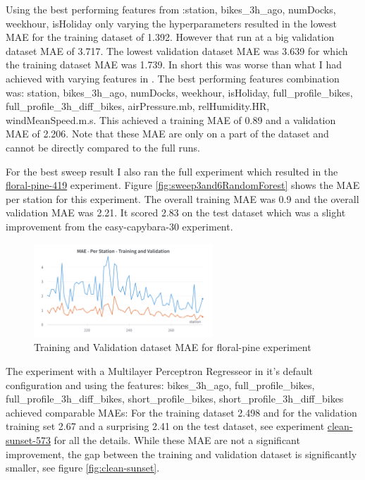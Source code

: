 \documentclass[a4paper]{article}
\begin{document}
    Using the best performing features from :station, bikes\_3h\_ago, numDocks, weekhour, isHoliday
    only varying the hyperparameters resulted in the lowest MAE for the training dataset of 1.392. However that run at
    a big validation dataset MAE of 3.717. The lowest validation dataset MAE was 3.639 for which the training dataset
    MAE was 1.739. In short this was worse than what I had achieved with varying features in .
    The best performing features combination was: station, bikes\_3h\_ago, numDocks, weekhour, isHoliday, full\_profile\_bikes,
    full\_profile\_3h\_diff\_bikes, airPressure.mb, relHumidity.HR, windMeanSpeed.m.s. This achieved a training MAE of 0.89
    and a validation MAE of 2.206. Note that these MAE are only on a part of the dataset and cannot be directly compared
    to the full runs.

    For the best sweep result I also ran the full experiment which resulted in the
    \href{https://wandb.ai/idegen/mlp-2021/runs/2kmp7odq?workspace=user-idegen}{floral-pine-419} experiment. Figure \ref{fig:sweep3and6RandomForest}
    shows the MAE per station for this experiment. The overall training MAE was 0.9 and the overall validation MAE was
    2.21. It scored 2.83 on the test dataset which was a slight improvement from the easy-capybara-30 experiment.

    \begin{figure}[h]
        \centering
        \includegraphics[width=0.6\textwidth]{floral-pine}
        \caption{Training and Validation dataset MAE for floral-pine experiment}
        \label{fig:floral-pine}
    \end{figure}

    The experiment with a Multilayer Perceptron Regresseor in it's default configuration and using the features: bikes\_3h\_ago,
    full\_profile\_bikes, full\_profile\_3h\_diff\_bikes, short\_profile\_bikes, short\_profile\_3h\_diff\_bikes achieved
    comparable MAEs: For the training dataset 2.498 and for the validation training set 2.67 and a surprising 2.41 on the test dataset,
    see experiment \href{https://wandb.ai/idegen/mlp-2021/runs/1of4938t?workspace=user-idegen}{clean-sunset-573} for all the details.
    While these MAE are not a significant improvement, the gap between the training and validation dataset is significantly
    smaller, see figure \ref{fig:clean-sunset}.
\end{document}
